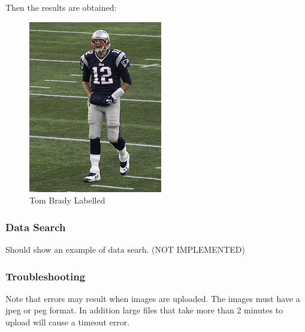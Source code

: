 \documentclass{scrreprt}
\begin{document}
Then the results are obtained:


\begin{figure}
  \includegraphics[width=\linewidth]{tbrady.jpg}
  \caption{Tom Brady Labelled}
  \label{fig:labelledBrady}
\end{figure}


\subsubsection{Data Search}
Should show an example of data searh. (NOT IMPLEMENTED)


\subsubsection{Troubleshooting}

Note that errors may result when images are uploaded.  The images must have a jpeg or peg format.  In addition large files that take more than 2 minutes to upload will cause a timeout error.
\end{document}

